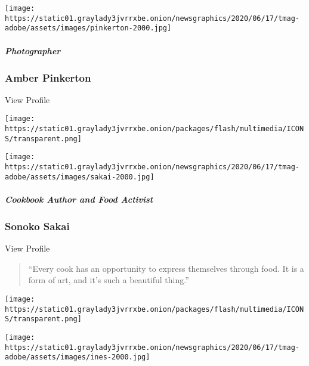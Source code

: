 \texttt{[image: https://static01.graylady3jvrrxbe.onion/newsgraphics/2020/06/17/tmag-adobe/assets/images/pinkerton-2000.jpg]}

\href{https://www.nytimes3xbfgragh.onion/2020/08/10/t-magazine/amber-pinkerton-photography.html}{}

\hypertarget{photographer}{%
\subparagraph{Photographer}\label{photographer}}

\hypertarget{amber-pinkerton}{%
\subsubsection{Amber Pinkerton}\label{amber-pinkerton}}

View Profile

\href{https://www.nytimes3xbfgragh.onion/2020/08/10/t-magazine/sonoko-sakai-chef-cooking-soba.html}{}

\texttt{[image: https://static01.graylady3jvrrxbe.onion/packages/flash/multimedia/ICONS/transparent.png]}

\texttt{[image: https://static01.graylady3jvrrxbe.onion/newsgraphics/2020/06/17/tmag-adobe/assets/images/sakai-2000.jpg]}

\href{https://www.nytimes3xbfgragh.onion/2020/08/10/t-magazine/sonoko-sakai-chef-cooking-soba.html}{}

\hypertarget{cookbook-author-and-food-activist}{%
\subparagraph{Cookbook Author and Food
Activist}\label{cookbook-author-and-food-activist}}

\hypertarget{sonoko-sakai}{%
\subsubsection{Sonoko Sakai}\label{sonoko-sakai}}

View Profile

\begin{quote}
``Every cook has an opportunity to express themselves through food. It
is a form of art, and it's such a beautiful thing.''
\end{quote}

\href{https://www.nytimes3xbfgragh.onion/2020/08/10/t-magazine/daniela-soto-innes-cooking-chef.html}{}

\texttt{[image: https://static01.graylady3jvrrxbe.onion/packages/flash/multimedia/ICONS/transparent.png]}

\texttt{[image: https://static01.graylady3jvrrxbe.onion/newsgraphics/2020/06/17/tmag-adobe/assets/images/ines-2000.jpg]}


